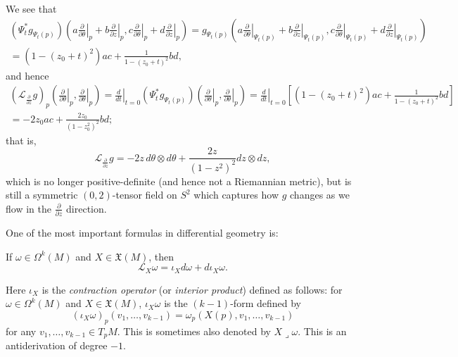 \begin{example}
	We see that 
	\begin{multline*}
		(\Psi_t^\ast g_{\Psi_t(p)})\left(a \left.\frac{\partial}{\partial \theta}\right|_p + b \left.\frac{\partial}{\partial z}\right|_p, c \left.\frac{\partial}{\partial \theta}\right|_p + d \left.\frac{\partial}{\partial z}\right|_p\right) =  g_{\Psi_t(p)}\left(a \left.\frac{\partial}{\partial \theta}\right|_{\Psi_t(p)} + b \left.\frac{\partial}{\partial z}\right|_{\Psi_t(p)}, c \left.\frac{\partial}{\partial \theta}\right|_{\Psi_t(p)} + d \left.\frac{\partial}{\partial z}\right|_{\Psi_t(p)}\right)  \\
		= (1-(z_0+t)^2)ac + \frac{1}{1-(z_0+t)^2}bd,
	\end{multline*}
	and hence
	\begin{multline*}
		(\mathcal{L}_{\frac{\partial}{\partial z}} g)_p\left(\left.\frac{\partial}{\partial \theta}\right|_p,\left.\frac{\partial}{\partial \theta}\right|_p\right) = \left. \frac{d}{dt}\right|_{t=0} (\Psi_t^\ast g_{\Psi_t(p)})\left(\left.\frac{\partial}{\partial \theta}\right|_p,\left.\frac{\partial}{\partial \theta}\right|_p\right) = \left. \frac{d}{dt}\right|_{t=0} \left[(1-(z_0+t)^2)ac + \frac{1}{1-(z_0+t)^2}bd\right] \\
		= -2z_0 ac + \frac{2z_0}{(1-z_0^2)^2}bd;
	\end{multline*}
	that is,
	\[
		\mathcal{L}_{\frac{\partial}{\partial z}} g = -2z\, d\theta \otimes d\theta + \frac{2z}{(1-z^2)^2}dz \otimes dz,
	\]
	which is no longer positive-definite (and hence not a Riemannian metric), but is still a symmetric $(0,2)$-tensor field on $S^2$ which captures how $g$ changes as we flow in the $\frac{\partial}{\partial z}$ direction.
\end{example}

One of the most important formulas in differential geometry is:
\begin{theorem}\label{thm:cartan}
	If $\omega \in \Omega^k(M)$ and $X \in \mathfrak{X}(M)$, then
	\[
		\mathcal{L}_X \omega = \iota_X d\omega + d \iota_X \omega.
	\]
\end{theorem}
Here $\iota_X$ is the \emph{contraction operator} (or \emph{interior product}) defined as follows: for $\omega \in \Omega^k(M)$ and $X \in \mathfrak{X}(M)$, $\iota_X\omega$ is the $(k-1)$-form defined by
\[
	(\iota_X\omega)_p(v_1, \dots , v_{k-1}) = \omega_p(X(p),v_1, \dots , v_{k-1})
\]
for any $v_1, \dots , v_{k-1} \in T_pM$. This is sometimes also denoted by $X \lrcorner \omega$. This is an antiderivation of degree $-1$.

